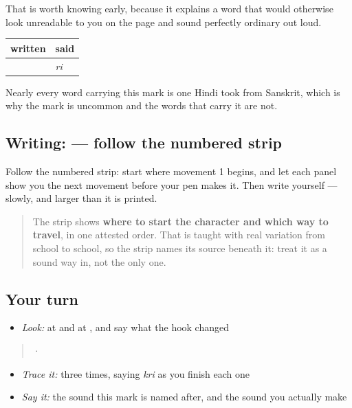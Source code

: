 That is worth knowing early, because it explains a word that would otherwise look unreadable to you on the page and sound perfectly ordinary out loud.

\noindent
\begin{tabularx}{\linewidth}{@{}>{\raggedright\arraybackslash}X>{\raggedright\arraybackslash}X@{}}
\toprule
\textbf{written} & \textbf{said} \\
\midrule
\hi{◌ृ} & \emph{ri} \\
\bottomrule
\end{tabularx}

Nearly every word carrying this mark is one Hindi took from Sanskrit, which is why the mark is uncommon and the words that carry it are not.

\subsection*{Writing:  — follow the numbered strip}

Follow the numbered strip: start where movement 1 begins, and let each panel show you the next movement before your pen makes it. Then write \textbf{} yourself — slowly, and larger than it is printed.

\begin{quote}
The strip shows \textbf{where to start the character and which way to travel}, in one attested order. That is taught with real variation from school to school, so the strip names its source beneath it: treat it as a sound way in, not the only one.
\end{quote}

\subsection*{Your turn}
\begin{itemize}
\raggedright
  \item \emph{Look:} at  and at , and say what the hook changed
\end{itemize}

\begin{quote}
  ·  
\end{quote}

\begin{itemize}
\raggedright
  \item \emph{Trace it:}  three times, saying \emph{kri} as you finish each one
  \item \emph{Say it:} the sound this mark is named after, and the sound you actually make
\end{itemize}


